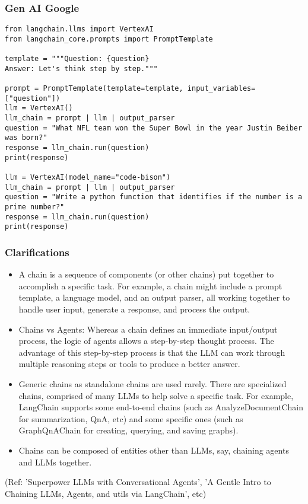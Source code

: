 \begin{frame}[fragile]\frametitle{Gen AI Google}


\begin{lstlisting}
from langchain.llms import VertexAI
from langchain_core.prompts import PromptTemplate

template = """Question: {question}
Answer: Let's think step by step."""

prompt = PromptTemplate(template=template, input_variables=["question"])
llm = VertexAI()
llm_chain = prompt | llm | output_parser
question = "What NFL team won the Super Bowl in the year Justin Beiber was born?"
response = llm_chain.run(question)
print(response)

llm = VertexAI(model_name="code-bison")
llm_chain = prompt | llm | output_parser
question = "Write a python function that identifies if the number is a prime number?"
response = llm_chain.run(question)
print(response)
\end{lstlisting}


\end{frame}




\begin{frame}[fragile]\frametitle{Clarifications}

\begin{itemize}
\item A chain is a sequence of components (or other chains) put together to accomplish a specific task. For example, a chain might include a prompt template, a language model, and an output parser, all working together to handle user input, generate a response, and process the output.
\item Chains vs Agents: Whereas a chain defines an immediate input/output process, the logic of agents allows a step-by-step thought process. The advantage of this step-by-step process is that the LLM can work through multiple reasoning steps or tools to produce a better answer.
\item Generic chains as standalone chains are used rarely. There are specialized chains, comprised of many LLMs to help solve a specific task. For example, LangChain supports some end-to-end chains (such as AnalyzeDocumentChain for summarization, QnA, etc) and some specific ones (such as GraphQnAChain for creating, querying, and saving graphs). 
\item Chains can be composed of entities other than LLMs, say, chaining agents and LLMs together.
\end{itemize}

{\tiny (Ref: 'Superpower LLMs with Conversational Agents', 'A Gentle Intro to Chaining LLMs, Agents, and utils via LangChain', etc)}
\end{frame}

